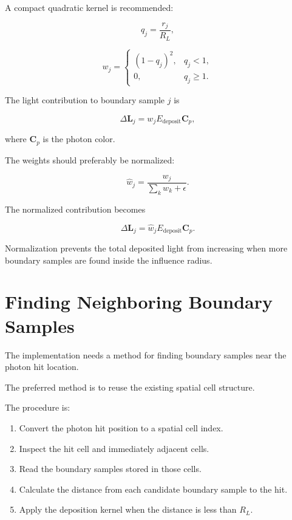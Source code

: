 \documentclass[11pt]{article}
\begin{document}
A compact quadratic kernel is recommended:

\begin{equation}
    q_{j}
    =
    \frac{r_{j}}{R_{L}},
\end{equation}

\begin{equation}
    w_{j}
    =
    \begin{cases}
        \left(1-q_{j}\right)^{2},
        & q_{j}<1,\\
        0,
        & q_{j}\geq 1.
    \end{cases}
\end{equation}

The light contribution to boundary sample $j$ is

\begin{equation}
    \Delta \mathbf{L}_{j}
    =
    w_{j}
    E_{\mathrm{deposit}}
    \mathbf{C}_{p},
\end{equation}

where $\mathbf{C}_{p}$ is the photon color.

The weights should preferably be normalized:

\begin{equation}
    \widehat{w}_{j}
    =
    \frac{w_{j}}
    {\sum_{k}w_{k}+\epsilon}.
\end{equation}

The normalized contribution becomes

\begin{equation}
    \Delta \mathbf{L}_{j}
    =
    \widehat{w}_{j}
    E_{\mathrm{deposit}}
    \mathbf{C}_{p}.
\end{equation}

Normalization prevents the total deposited light from increasing when more
boundary samples are found inside the influence radius.

\section{Finding Neighboring Boundary Samples}

The implementation needs a method for finding boundary samples near the photon
hit location.

The preferred method is to reuse the existing spatial cell structure.

The procedure is:

\begin{enumerate}
    \item Convert the photon hit position to a spatial cell index.
    \item Inspect the hit cell and immediately adjacent cells.
    \item Read the boundary samples stored in those cells.
    \item Calculate the distance from each candidate boundary sample to the hit.
    \item Apply the deposition kernel when the distance is less than $R_{L}$.
\end{enumerate}
\end{document}
